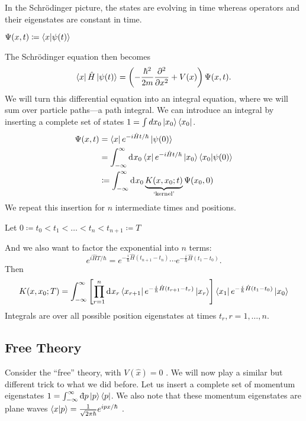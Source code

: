 In the Schr\"odinger picture, the states are evolving in time whereas operators and their eigenstates are constant in time.
\begin{definition}[wavefunction]
  $\Psi(x, t) \coloneqq \bra{x} \ket{\psi(t)}$
\end{definition}
The Schr\"odinger equation then becomes
\begin{equation}
  \bra{x}\hat{H} \ket{\psi(t)} = \left( -\frac{\hbar^2}{2m} \frac{\partial^2 }{\partial x^2} + V(x) \right) \Psi(x, t).
\end{equation}
We will turn this differential equation into an integral equation, where we will sum over particle paths---a path integral.
We can introduce an integral by inserting a complete set of states $1 = \int dx_0 \ket{x_0}\bra{x_0}$.
\begin{align}
  \Psi(x, t) &= \bra{x}e^{-i \hat{H} t / \hbar} \ket{\psi(0)} \\
	     &= \int_{-\infty}^{\infty} \dd[]{x_0} \bra{x} e^{-i \hat{H} t / \hbar} \ket{x_0} \bra{x_0} \ket{\psi(0)} \\
	     &\coloneqq \int_{-\infty}^{\infty}\dd[]{x_0} \underbrace{K(x, x_0; t)}_{\mathclap{\text{`kernel'}}} \Psi(x_0, 0)
\end{align}
We repeat this insertion for $n$ intermediate times and positions.
\begin{notation}[]
  Let $0 \coloneqq t_0 < t_1 < \dots < t_n < t_{n+1} \coloneqq T$
\end{notation}
And we also want to factor the exponential into $n$  terms:
\begin{equation}
  e^{i \hat{H} T / \hbar} = e^{-\frac{i}{\hbar} \hat{H} (t_{n+1} - t_n)} \cdots e^{-\frac{i}{\hbar} \hat{H} (t_{1} - t_0)}.
\end{equation}
Then
\begin{equation}
  K(x, x_0; T) = \int_{-\infty}^{\infty} \left[ \prod_{r =1}^n \dd[]{x_r} \bra{x_{r+1}} e^{-\frac{i}{\hbar} \hat{H} (t_{r+1}-t_r)} \ket{x_r} \right] \bra{x_1}e^{-\frac{i}{\hbar} \hat{H}(t_1 - t_0)}\ket{x_0}
\end{equation}
Integrals are over all possible position eigenstates at times $t_r, r = 1, \dots, n$.

\subsection*{Free Theory}%

Consider the ``free'' theory, with $V(\hat{x}) = 0$ .
We will now play a similar but different trick to what we did before. Let us insert a complete set of momentum eigenstates $1 = \int_{-\infty}^{\infty}\bdd[]{p} \ket{p}\bra{p}$. We also note that these momentum eigenstates are plane waves $\bra{x}\ket{p} = \frac{1}{\sqrt{2 \pi \hbar}} e^{i p x / \hbar}$ .

